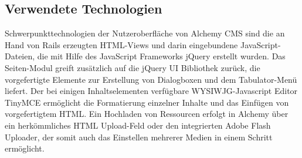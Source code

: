 \subsection{Verwendete Technologien}
Schwerpunkttechnologien der Nutzeroberfläche von Alchemy CMS sind die an Hand von Rails erzeugten HTML-Views und darin eingebundene JavaScript-Dateien, die mit Hilfe des JavaScript Frameworks jQuery erstellt wurden.
Das Seiten-Modul greift zusätzlich auf die jQuery UI Bibliothek zurück, die vorgefertigte Elemente zur Erstellung von Dialogboxen und dem Tabulator-Menü liefert.
Der bei einigen Inhaltselementen verfügbare WYSIWJG-Javascript Editor TinyMCE ermöglicht die Formatierung einzelner Inhalte und das Einfügen von vorgefertigtem HTML.
Ein Hochladen von Ressourcen erfolgt in Alchemy über ein herkömmliches HTML Upload-Feld oder den integrierten Adobe Flash Uploader, der somit auch das Einstellen mehrerer Medien in einem Schritt ermöglicht.




\newpage
